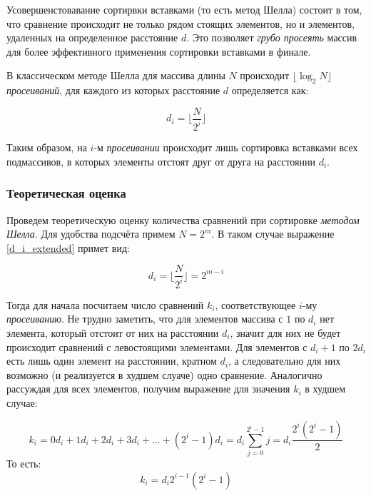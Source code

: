 \documentclass[a4paper,12pt,titlepage,finall]{article}
\begin{document}
\par
Усовершенстовавание сортирвки вставками (то есть метод Шелла) состоит в том, что сравнение происходит не только рядом стоящих элементов, но и элементов, удаленных на определенное расстояние $d$. Это позволяет \textit{грубо просеять} массив для более эффективного применения сортировки вставками в финале. 
\par

В классическом методе Шелла для массива длины $N$ происходит $\lfloor \log_{2}{N} \rfloor$  \textit{просеиваний}, для каждого из которых расстояние $d$ определяется как: 

\begin{equation}\label{d_i_extended}
d_i = \lfloor \frac{N}{2^i} \rfloor
\end{equation}

Таким образом, на $i$-м \textit{просеивании} происходит лишь сортировка вставками всех подмассивов, в которых элементы отстоят друг от друга на расстоянии $d_i$.

\subsubsection*{Теоретическая оценка} 

Проведем теоретическую оценку количества сравнений при сортировке \textit{методом Шелла}. Для удобства подсчёта примем $N = 2 ^ m$. В таком случае выражение \eqref{d_i_extended} примет вид:

\begin{equation}\label{d_i}
d_i = \lfloor \frac{N}{2^i} \rfloor = 2^{m-i}
\end{equation}

Тогда для начала посчитаем число сравнений $k_i$, соответствующее $i$-му \textit{просеиванию}. Не трудно заметить, что для элементов массива с $1$ по $d_i$ нет элемента, который отстоит от них на расстоянии $d_i$, значит для них не будет происходит сравнений с левостоящими элементами. Для элементов с $d_i+1$ по $2 d_i$ есть лишь один элемент на расстоянии, кратном $d_i$, а следовательно для них возможно (и реализуется в худшем слуаче) одно сравнение. Аналогично рассуждая для всех элементов, получим выражение для значения $k_i$ в худшем случае:

$$k_i = 0d_i + 1d_i + 2d_i + 3d_i + \dots + (2^i - 1)d_i = d_i  \displaystyle\sum_{j=0}^{2^i - 1} j = d_i  \frac{2^i (2^i - 1) }{2}$$
То есть:
\begin{equation}\label{k_i}
k_i = d_i2^{i-1} (2^i - 1)
\end{equation}
\end{document}
